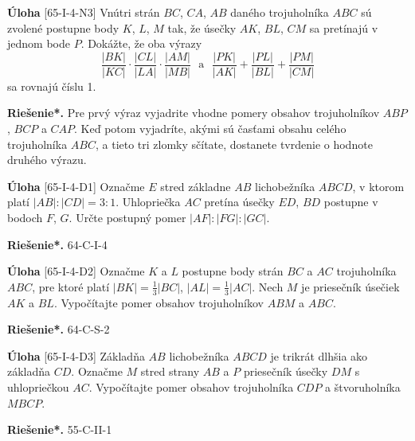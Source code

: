 \documentclass{article}
\newcommand{\rieh}{\textbf{Riešenie*.} }
\newcommand{\problem}[4]{
  \begin{tcolorbox}[breakable,notitle,boxrule=0pt,colback=light-gray,colframe=light-gray]
    \textbf{Úloha}
    [#1] #3
  \end{tcolorbox}
  \noindent#4
}
\begin{document}
\problem{65-I-4-N3}{}{
Vnútri strán $BC$, $CA$, $AB$ daného trojuholníka $ABC$ sú zvolené postupne body $K$, $L$, $M$ tak, že úsečky $AK$, $BL$, $CM$ sa pretínajú v jednom bode $P$. Dokážte, že oba výrazy
$$\frac{|BK|}{|KC|}\cdot \frac{|CL|}{|LA|}\cdot \frac{|AM|}{|MB|} \ \ \ \text{a} \ \ \ \frac{|P K|}{|AK|}+\frac{|P L|}{|BL|}+\frac{|P M|}{|CM|}$$
sa rovnajú číslu 1.
}{
\rieh Pre prvý výraz vyjadrite vhodne pomery obsahov trojuholníkov $ABP$, $BCP$ a $CAP$. Keď potom vyjadríte, akými sú časťami obsahu celého trojuholníka $ABC$, a tieto tri zlomky sčítate, dostanete tvrdenie o hodnote druhého výrazu.
}


\problem{65-I-4-D1}{}{
Označme $E$ stred základne $AB$ lichobežníka $ABCD$, v ktorom platí $|AB| : |CD| = 3 : 1$. Uhlopriečka $AC$ pretína úsečky $ED$, $BD$ postupne v bodoch $F$, $G$. Určte postupný pomer $|AF | : |F G| : |GC|$.
}{
\rieh 64-C-I-4
}


\problem{65-I-4-D2}{}{
Označme $K$ a $L$ postupne body strán $BC$ a $AC$ trojuholníka $ABC$, pre ktoré platí $|BK| =\frac{1}{3}|BC|$, $|AL| =\frac{1}{3}|AC|$. Nech $M$ je priesečník úsečiek $AK$ a $BL$. Vypočítajte pomer obsahov trojuholníkov $ABM$ a $ABC$.
}{
\rieh 64-C-S-2
}


\problem{65-I-4-D3}{}{
Základňa $AB$ lichobežníka $ABCD$ je trikrát dlhšia ako základňa $CD$. Označme $M$ stred strany $AB$ a $P$ priesečník úsečky $DM$ s uhlopriečkou $AC$. Vypočítajte pomer obsahov trojuholníka $CDP$ a štvoruholníka $MBCP$.
}{
\rieh 55-C-II-1
}
\end{document}
